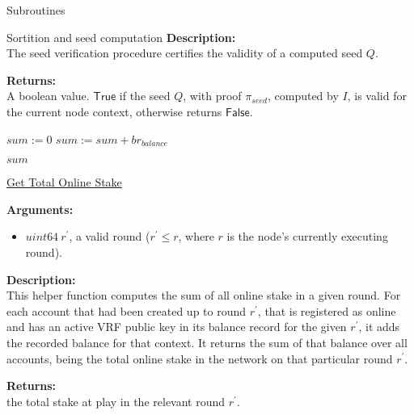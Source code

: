 \documentclass[10pt,a4paper]{article}
\begin{document}
\begin{section}{Subroutines}
\begin{subsection}{Sortition and seed computation}
\noindent \textbf{Description:}\\ The seed verification procedure certifies the validity of a computed seed $Q$.


\noindent \textbf{Returns:}\\ A boolean value. $\mathsf{True}$ if the seed $Q$, with proof $\pi_{seed}$, computed by $I$,
    is valid for the current node context, otherwise returns $\mathsf{False}$.


\begin{algorithm}[H]\label{algo:get-total-online-stake}
    \begin{algorithmic}[1]
        
        \State $sum := 0$
                \State $sum := sum + br_{balance}$
            \EndIf
        \EndFor

        \State \Return $sum$

        \EndFunction
    \end{algorithmic}
    \caption{\underline{Get Total Online Stake}}
\end{algorithm}

\noindent \textbf{Arguments:}
\begin{itemize}
    \item $uint64 \ r^\prime$, a valid round ($r^\prime \leq r$, where $r$ is the node's currently executing round).
  \end{itemize}


\noindent \textbf{Description:}\\
This helper function computes the sum of all online stake in a given round.
For each account that had been created up to round $r^\prime$, that is registered as online 
and has an active VRF public key in its balance record for the given $r^\prime$, 
it adds the recorded balance for that context.
It returns the sum of that balance over all accounts, being the total online stake
in the network on that particular round $r^\prime$.

\noindent \textbf{Returns:} \\
the total stake at play in the relevant round $r^\prime$.



\end{subsection}
\end{section}
\end{document}
